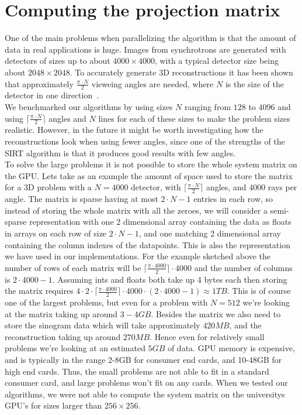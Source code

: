 \section{Computing the projection matrix}
One of the main problems when parallelizing the algorithm is that the amount of data in real applications is huge. Images from synchrotrons are generated with detectors of sizes up to about $4000\times4000$, with a typical detector size being about $2048\times2048$. To accurately generate 3D reconstructions it has been shown that approximately $\frac{\pi\cdot N}{2}$ vieweing angles are needed, where $N$ is the size of the detector in one direction~\cite{natterer2001}.\\
We benchmarked our algorithms by using sizes $N$ ranging from $128$ to $4096$ and using $\lceil\frac{\pi\cdot N}{2}\rceil$ angles and $N$ lines for each of these sizes to make the problem sizes realistic. However, in the future it might be worth investigating how the reconstructions look when using fewer angles, since one of the strengths of the SIRT algorithm is that it produces good results with few angles.\\
To solve the large problems it is not possible to store the whole system matrix on the GPU. Lets take as an example the amount of space used to store the matrix for a 3D problem with a $N=4000$ detector, with $\lceil\frac{\pi\cdot N}{2}\rceil$ angles, and $4000$ rays per angle. The matrix is sparse having at most $2\cdot N-1$ entries in each row, so instead of storing the whole matrix with all the zeroes, we will consider a semi-sparse representation with one 2 dimensional array containing the data as floats in arrays on each row of size  $2\cdot N-1$, and one matching 2 dimensional array containing the column indexes of the datapoints. This is also the representation we have used in our implementations. For the example sketched above the number of rows of each matrix will be $\lceil\frac{\pi\cdot4000}{2}\rceil\cdot4000$ and the number of columns is $2\cdot 4000-1$. Assuming ints and floats both take up 4 bytes each then storing the matrix requires $4\cdot 2\cdot\lceil\frac{ \pi \cdot 4000}{2} \rceil \cdot 4000 \cdot (2 \cdot 4000-1) \approx1TB$. This is of course one of the largest problems, but even for a problem with $N=512$ we're looking at the matrix taking up around $3-4GB$. Besides the matrix we also need to store the sinogram data which will take approximately $420MB$, and the reconstruction taking up around $270MB$. Hence even for relatively small problems we're looking at an estimated $5GB$ of data. GPU memory is expensive, and is typically in the range 2-8GB for consumer end cards, and 10-48GB for high end cards. Thus, the small problems are not able to fit in a standard consumer card, and large problems won't fit on any cards. When we tested our algorithms, we were not able to compute the system matrix on the universitys GPU's for sizes larger than $256\times256$.\\
